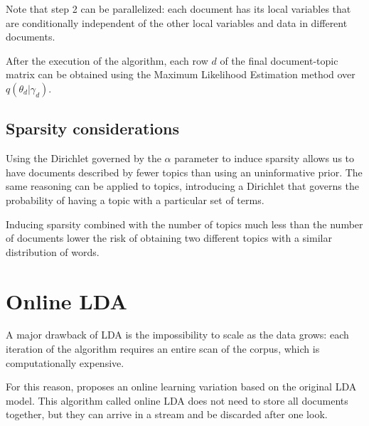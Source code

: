 Note that step 2 can be parallelized: each document has its local variables that are conditionally independent
of the other local variables and data in different documents.

After the execution of the algorithm, each row $d$ of the final document-topic matrix can be obtained using the Maximum Likelihood Estimation method over $q(\theta_d | \gamma_d)$.

\subsection{Sparsity considerations} \label{sparsity_lda}
Using the Dirichlet governed by the $\alpha$ parameter to induce sparsity
allows us to have documents described by fewer topics than using an uninformative prior.
The same reasoning can be applied to topics, introducing a Dirichlet that governs the
probability of having a topic with a particular set of terms.

Inducing sparsity combined with the number of topics much less than the number of documents
lower the risk of obtaining two different topics with a similar distribution of words.


\section{Online LDA}
A major drawback of LDA is the impossibility to scale as the data grows:
each iteration of the algorithm requires an entire scan of the corpus, which is computationally expensive.

For this reason, \cite{NIPS2010_3902} proposes an online learning variation based on the original LDA model.
This algorithm called online LDA does not need to store all documents together,
but they can arrive in a stream and be discarded after one look.

